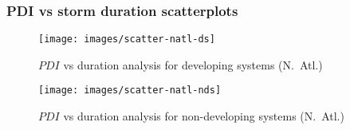 \begin{table}[H]
	\centering
	\caption{Summary of the $PDI$ vs maximum wind speed linear regressions for developing systems}
	\label{tab:pdi-corrs-wind}
\end{table}

\newpage
\subsubsection{PDI vs storm duration scatterplots}\label{ssec:pdi-corr-duration}
\begin{figure}[H]
	\centering
	\texttt{[image: images/scatter-natl-ds]}
	\caption{$PDI$ vs duration analysis for developing systems (N.~Atl.)}
	\label{fig:scatter-natl-ds}
\end{figure}

\begin{figure}[H]
	\centering
	\texttt{[image: images/scatter-natl-nds]}
	\caption{$PDI$ vs duration analysis for non-developing systems (N.~Atl.)}
	\label{fig:scatter-natl-nds}
\end{figure}

